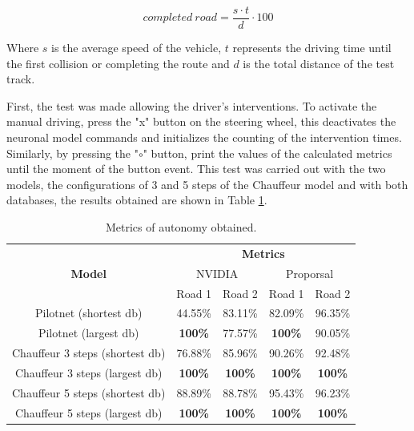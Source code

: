 \documentclass[conference]{IEEEtran}
\begin{document}
\begin{equation}
completed\ road = \frac{s \cdot t}{d} \cdot 100
\label{eq:completed road}
\end{equation}

Where $s$ is the average speed of the vehicle, $t$ represents the driving time until the first collision or completing the route and $d$ is the total distance of the test track.


First, the test was made allowing the driver's interventions. To activate the manual driving, press the "x" button on the steering wheel, this deactivates the neuronal model commands and initializes the counting of the intervention times. Similarly, by pressing the "$\circ$" button, print the values of the calculated metrics until the moment of the button event. This test was carried out with the two models, the configurations of 3 and 5 steps of the Chauffeur model and with both databases, the results obtained are shown in Table \ref{table:autonomy}.

\begin{table}[H]
	\caption{Metrics of autonomy obtained.}
	\begin{center}
		\begin{tabular}{|c|c|c|c|c|}
			\hline
			\multirow{3}{*}{\textbf{Model}} & \multicolumn{4}{|c|}{\textbf{Metrics}} \\\cline{2-5} 
			& \multicolumn{2}{|c|}{NVIDIA} & \multicolumn{2}{|c|}{Proporsal} \\\cline{2-5} 
			& Road 1 & Road 2 & Road 1 & Road 2 \\\hline \hline
			
			Pilotnet (shortest db) & 44.55\% & 83.11\% & 82.09\% & 96.35\% \\\hline
			Pilotnet (largest db) & \textbf{100\%} & 77.57\% & \textbf{100\%} & 90.05\% \\\hline
			Chauffeur 3 steps (shortest db) & 76.88\% & 85.96\% & 90.26\% & 92.48\% \\\hline
			Chauffeur 3 steps (largest db) & \textbf{100\%} & \textbf{100\%}   & \textbf{100\%} & \textbf{100\%} \\\hline
			Chauffeur 5 steps (shortest db)& 88.89\% & 88.78\% & 95.43\% & 96.23\% \\\hline
			Chauffeur 5 steps  (largest db)& \textbf{100\%} & \textbf{100\%} & \textbf{100\%} & \textbf{100\%} \\\hline
		\end{tabular}
		\label{table:autonomy}
	\end{center}
\end{table}
\end{document}
